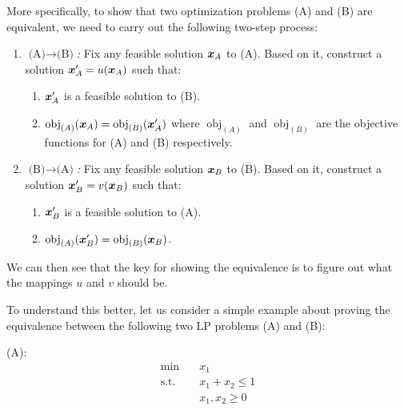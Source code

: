 \begin{enumerate}
More specifically, to show that two optimization problems (A) and (B) are
equivalent, we need to carry out the following two-step process:
\begin{enumerate}[label={(\arabic*)}]
\item \emph{\(\text{(A)}\to\text{(B)}\):} Fix any feasible solution
\(\bm{x}_{A}\) to (A). Based on it, construct a solution
\(\bm{x}_A'=u(\bm{x}_A)\) such that:
\begin{enumerate}
\item \(\bm{x}_A'\) is a feasible solution to (B).
\item
\(\operatorname{obj}_{(A)}(\bm{x}_A)=\operatorname{obj}_{(B)}(\bm{x}_A')\)
where \(\operatorname{obj}_{(A)}\) and \(\operatorname{obj}_{(B)}\) are the objective functions for (A) and (B) respectively.
\end{enumerate}
\item \emph{\(\text{(B)}\to\text{(A)}\):} Fix any feasible solution
\(\bm{x}_{B}\) to (B). Based on it, construct a solution
\(\bm{x}_B'=v(\bm{x}_B)\) such that:
\begin{enumerate}
\item \(\bm{x}_B'\) is a feasible solution to (A).
\item \(\operatorname{obj}_{(A)}(\bm{x}_B')=\operatorname{obj}_{(B)}(\bm{x}_B)\).
\end{enumerate}
\end{enumerate}
We can then see that the key  for showing the equivalence is to
figure out what the mappings \(u\) and \(v\) should be.

\begin{center}
\end{center}

To understand this better, let us consider a simple example about proving the
equivalence between the following two LP problems (A) and (B):

(A): \begin{align*}
\text{min}\quad&x_1 \\
\text{s.t.}\quad&x_1+x_2\le 1\\
\quad&x_1,x_2\ge 0
\end{align*}


\end{enumerate}
